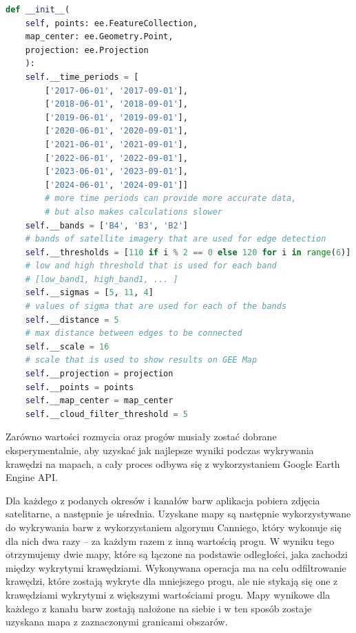\begin{lstlisting}[language=Python, caption=Metoda \_\_init\_\_() klasy EdgeDetector, style=python_style]
def __init__(
    self, points: ee.FeatureCollection,
    map_center: ee.Geometry.Point,
    projection: ee.Projection
    ):
    self.__time_periods = [
        ['2017-06-01', '2017-09-01'],
        ['2018-06-01', '2018-09-01'],
        ['2019-06-01', '2019-09-01'],
        ['2020-06-01', '2020-09-01'],
        ['2021-06-01', '2021-09-01'],
        ['2022-06-01', '2022-09-01'],
        ['2023-06-01', '2023-09-01'],
        ['2024-06-01', '2024-09-01']]  
        # more time periods can provide more accurate data, 
        # but also makes calculations slower
    self.__bands = ['B4', 'B3', 'B2']  
    # bands of satellite imagery that are used for edge detection
    self.__thresholds = [110 if i % 2 == 0 else 120 for i in range(6)]  
    # low and high threshold that is used for each band 
    # [low_band1, high_band1, ... ]
    self.__sigmas = [5, 11, 4]  
    # values of sigma that are used for each of the bands
    self.__distance = 5  
    # max distance between edges to be connected
    self.__scale = 16  
    # scale that is used to show results on GEE Map
    self.__projection = projection
    self.__points = points
    self.__map_center = map_center
    self.__cloud_filter_threshold = 5
\end{lstlisting}

Zarówno wartości rozmycia oraz progów musiały zostać dobrane eksperymentalnie, aby uzyskać jak najlepsze wyniki podczas wykrywania krawędzi na mapach, a cały proces odbywa się z wykorzystaniem Google Earth Engine API.

Dla każdego z podanych okresów i kanałów barw aplikacja pobiera zdjęcia satelitarne, a następnie je uśrednia. Uzyskane mapy są następnie wykorzystywane do wykrywania barw z wykorzystaniem algorymu Canniego, który wykonuje się dla nich dwa razy -- za każdym razem z inną wartością progu. W wyniku tego otrzymujemy dwie mapy, które są łączone na podstawie odległości, jaka zachodzi między wykrytymi krawędziami. Wykonywana operacja ma na celu odfiltrowanie krawędzi, które zostają wykryte dla mniejszego progu, ale nie stykają się one z krawędziami wykrytymi z większymi wartościami progu. Mapy wynikowe dla każdego z kanału barw zostają nałożone na siebie i w ten sposób zostaje uzyskana mapa z zaznaczonymi granicami obszarów.

